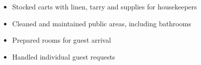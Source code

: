\begin{itemize}
  \item Stocked carts with linen, tarry and supplies for housekeepers
  \item Cleaned and maintained public areas, including bathrooms
  \item Prepared rooms for guest arrival
  \item Handled individual guest requests
\end{itemize}
